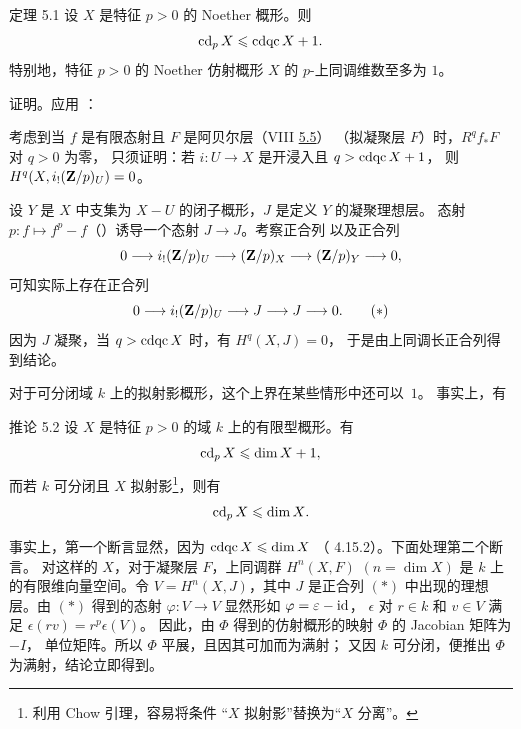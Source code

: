 \begin{enonce*}{定理 5.1}
设 $X$ 是特征 $p>0$ 的 Noether 概形。则
$$
\cd_pX\leq \cdqc X+1{\quoi}.
$$
特别地，特征 $p>0$ 的 Noether 仿射概形 $X$ 的 $p$-上同调维数至多为 $1$。
\end{enonce*}

证明。应用 ：

考虑到当 $f$ 是有限态射且 $F$ 是阿贝尔层（VIII \hyperref[VIII.prop5.5]{5.5}）
（\resp 拟凝聚层 $F$）时，$R^q f_{\ast}F$ 对 $q>0$ 为零，
只须证明：若 $i:U\rightarrow X$ 是开浸入且 $q>\cdqc X+1$，
则 $H^q(X,\sisi{i_1}{i_!}(\ZZ/p)_U)=0$。

设 $Y$ 是 $X$ 中支集为 $X-U$ 的闭子概形，$J$ 是定义 $Y$ 的凝聚理想层。
态射 $p:f\mapsto f^p-f$（）诱导一个态射
$J\rightarrow J$。考察正合列  以及正合列
$$
0\longrightarrow i_{!}(\ZZ/p)_U\longrightarrow
(\ZZ/p)_X\longrightarrow
(\ZZ/p)_Y\longrightarrow 0{\quoi},
$$
可知实际上存在正合列
\begin{equation*}
0\longrightarrow i_{!}(\ZZ/p)_U\longrightarrow
J\longrightarrow J\longrightarrow 0{\quoi}.\tag{$\ast$}
\end{equation*}
因为 $J$ 凝聚，当 $q>\cdqc X$ 时，有 $H^q(X,J)=0$，
于是由上同调长正合列得到\pageoriginale 结论。

对于可分闭域 $k$ 上的拟射影概形，这个上界在某些情形中还可以~$1$。
事实上，有

\begin{enonce*}{推论 5.2}
设 $X$ 是特征 $p>0$ 的域 $k$ 上的有限型概形。有
$$
\cd_pX\leq \dim X+1{\quoi},
$$
而若 $k$ 可分闭且 $X$ 拟射影\footnote[1]{利用 Chow 引理，容易将条件
  “$X$ 拟射影”替换为“$X$ 分离”。}，则有
$$
\cd_pX\leq \dim X{\quoi}.
$$
\end{enonce*}

事实上，第一个断言显然，因为 $\cdqc X\leq \dim X$
（\cite{sga4.exp.X.bib.6} 4.15.2）。下面处理第二个断言。
对这样的 $X$，对于凝聚层 $F$，上同调群 $H^n(X,F)$ $(n=\dim X)$
是 $k$ 上的有限维向量空间。令 $V=H^n(X,J)$，其中 $J$ 是正合列 $(\ast)$
中出现的理想层。由 $(\ast)$ 得到的态射 $\varphi:V\rightarrow V$
显然形如 $\varphi=\epsilon-\id$， $\epsilon$ 对
$r\in k$ 和 $v\in V$ 满足 $\epsilon(rv)=r^p\epsilon(V)$。
因此，由 $\Phi$ 得到的仿射概形的映射 $\Phi$ 的 Jacobian 矩阵为 $-I$，
单位矩阵。所以 $\Phi$ 平展，且因其可加而为满射；
又因 $k$ 可分闭，便推出 $\Phi$ 为满射，结论立即得到。

